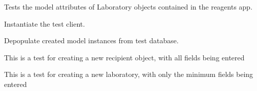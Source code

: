 \documentclass[letterpaper,10pt,english]{sphinxmanual}
\begin{document}

\begin{fulllineitems}
\label{api:experimentdb.sharing.tests.LaboratoryModelTests}
Tests the model attributes of Laboratory objects contained in the reagents app.

\begin{fulllineitems}
\label{api:experimentdb.sharing.tests.LaboratoryModelTests.setUp}
Instantiate the test client.

\end{fulllineitems}


\begin{fulllineitems}
\label{api:experimentdb.sharing.tests.LaboratoryModelTests.tearDown}
Depopulate created model instances from test database.

\end{fulllineitems}


\begin{fulllineitems}
\label{api:experimentdb.sharing.tests.LaboratoryModelTests.test_create_laboratory_all_fields}
This is a test for creating a new recipient object, with all fields being entered

\end{fulllineitems}


\begin{fulllineitems}
\label{api:experimentdb.sharing.tests.LaboratoryModelTests.test_create_laboratory_minimal}
This is a test for creating a new laboratory, with only the minimum fields being entered

\end{fulllineitems}


\end{fulllineitems}
\end{document}
